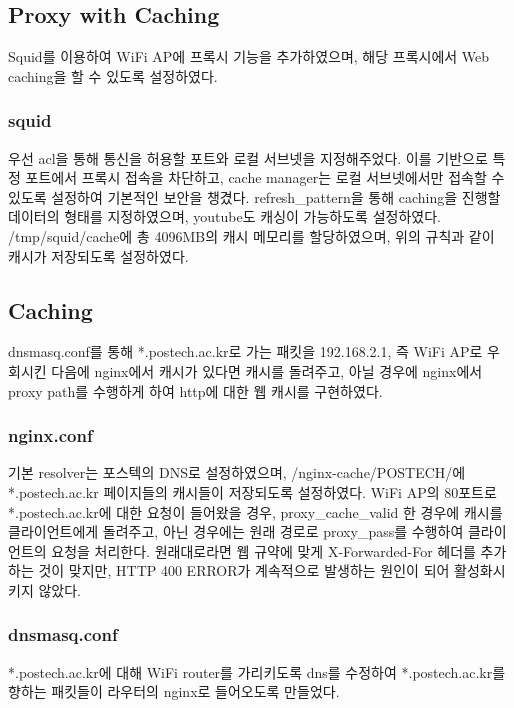 \documentclass{article}
\begin{document}
    \subsection{Proxy with Caching}
    Squid를 이용하여 WiFi AP에 프록시 기능을 추가하였으며, 해당 프록시에서 Web caching을 할 수 있도록 설정하였다.
    \subsubsection{squid}
    우선 acl을 통해 통신을 허용할 포트와 로컬 서브넷을 지정해주었다.
    이를 기반으로 특정 포트에서 프록시 접속을 차단하고, cache manager는 로컬 서브넷에서만 접속할 수 있도록 설정하여 기본적인 보안을 챙겼다.
    refresh\_pattern을 통해 caching을 진행할 데이터의 형태를 지정하였으며, youtube도 캐싱이 가능하도록 설정하였다.
    /tmp/squid/cache에 총 4096MB의 캐시 메모리를 할당하였으며, 위의 규칙과 같이 캐시가 저장되도록 설정하였다.


    \subsection{Caching}
    dnsmasq.conf를 통해 *.postech.ac.kr로 가는 패킷을 192.168.2.1, 즉 WiFi AP로 우회시킨 다음에 nginx에서 캐시가 있다면 캐시를 돌려주고,
    아닐 경우에 nginx에서 proxy path를 수행하게 하여 http에 대한 웹 캐시를 구현하였다.
    \subsubsection{nginx.conf}
    기본 resolver는 포스텍의 DNS로 설정하였으며, /nginx-cache/POSTECH/에 *.postech.ac.kr 페이지들의 캐시들이 저장되도록 설정하였다.
    WiFi AP의 80포트로 *.postech.ac.kr에 대한 요청이 들어왔을 경우, proxy\_cache\_valid 한 경우에 캐시를 클라이언트에게 돌려주고,
    아닌 경우에는 원래 경로로 proxy\_pass를 수행하여 클라이언트의 요청을 처리한다.
    원래대로라면 웹 규약에 맞게 X-Forwarded-For 헤더를 추가하는 것이 맞지만, HTTP 400 ERROR가 계속적으로 발생하는 원인이 되어 활성화시키지 않았다.
    \subsubsection{dnsmasq.conf}
    *.postech.ac.kr에 대해 WiFi router를 가리키도록 dns를 수정하여 *.postech.ac.kr를 향하는 패킷들이 라우터의 nginx로 들어오도록 만들었다.
\end{document}
